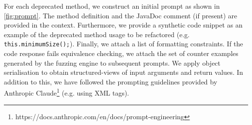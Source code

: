\documentclass[sigconf,review,anonymous]{acmart}
\begin{document}

For each deprecated method, we construct an initial prompt as shown in \autoref{fig:prompt}. The method
definition and the JavaDoc comment (if present) are provided in the context. Furthermore, we
provide a synthetic code snippet as an example of the deprecated method usage to be refactored
(e.g. \lstinline{this.minimumSize();}). Finally, we attach a list of formatting constraints.
If the code response fails equivalence checking, we attach the set of counter examples generated by the fuzzing
engine to subsequent prompts. We apply object serialisation to obtain structured-views of input arguments
and return values.
In addition to this, we have followed the prompting guidelines provided by Anthropic Claude\footnote{https://docs.anthropic.com/en/docs/prompt-engineering} (e.g. using XML tags).
\end{document}
